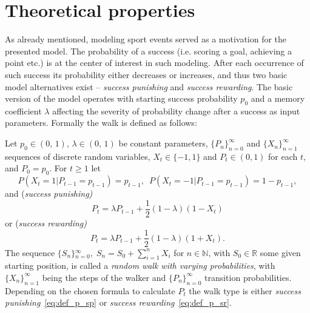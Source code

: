 \documentclass[runningheads]{CMSIM}
\begin{document}
    \section{Theoretical properties}\label{sec:theoretical-properties}

    As already mentioned, modeling sport events served as a motivation for the presented model.
    The probability of a success (i.e. scoring a goal, achieving
    a point etc.) is at the center of interest in such modeling.
    After each occurrence
    of such success its probability either decreases or increases, and
    thus two basic model alternatives exist -- \emph{success punishing} and \emph{success rewarding}.
    The basic version of the model operates
    with starting success probability $p_{0}$ and a memory coefficient
    $\lambda$ affecting the severity of probability change after a success
    as input parameters.
    Formally the walk is defined as follows:
    \begin{definition}
        \label{def:walk_definition}Let $\ensuremath{p_{0}\in(0,\,1),\,\lambda\in(0,\,1)}$
        be constant parameters, ${\{P_{n}\}}_{n=0}^{\infty}$ and ${\{X_{n}\}}_{n=1}^{\infty}$
        sequences of discrete random variables, $X_t\in\{-1,1\}$ and $P_t\in(0,1)$ for each $t$, and $P_{0}=p_{0}$.
        For $t\ge1$ let
        \[
            P(X_{t}=1|P_{t-1}=p_{t-1})=p_{t-1},\,\,\,P(X_{t}=-1|P_{t-1}=p_{t-1})=1-p_{t-1},
        \]
        and (\emph{success punishing)}
        \begin{equation}
            P_{t}=\lambda P_{t-1}+\frac{1}{2}(1-\lambda)(1-X_{t})\label{eq:def_p_sp}
        \end{equation}
        or (\emph{success rewarding)
            \begin{equation}
                P_{t}=\lambda P_{t-1}+\frac{1}{2}(1-\lambda)(1+X_{t}).\label{eq:def_p_sr}
            \end{equation}
        }The sequence ${\{S_{n}\}}{}_{n=0}^{\infty},\;S_{n}=S_{0}+\sum_{i=1}^{n}X_{i}$
        for $n\in\mathbb{N}$, with $S_{0}\in\mathbb{R}$ some given starting
        position, is called a \emph{random walk with varying probabilities},
        with ${\{X_{n}\}}_{n=1}^{\infty}$ being the steps of the walker and
        ${\{P_{n}\}}_{n=0}^{\infty}$ transition probabilities.
        Depending
        on the chosen formula to calculate $P_{t}$ the walk type is either
        \emph{success punishing}~\eqref{eq:def_p_sp} or \emph{success rewarding}~\eqref{eq:def_p_sr}.
    \end{definition}
\end{document}
